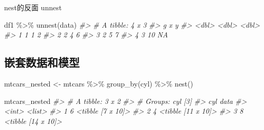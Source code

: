 \documentclass[
]{book}
\newenvironment{Shaded}{\begin{snugshade}}{\end{snugshade}}
\newcommand{\CommentTok}[1]{\textcolor[rgb]{0.56,0.35,0.01}{\textit{#1}}}
\newcommand{\FunctionTok}[1]{\textcolor[rgb]{0.00,0.00,0.00}{#1}}
\newcommand{\NormalTok}[1]{#1}
\newcommand{\OtherTok}[1]{\textcolor[rgb]{0.56,0.35,0.01}{#1}}
\newcommand{\SpecialCharTok}[1]{\textcolor[rgb]{0.00,0.00,0.00}{#1}}
\begin{document}
nest的反面 unnest

\begin{Shaded}
\begin{Highlighting}[]
\NormalTok{df1 }\SpecialCharTok{\%\textgreater{}\%} \FunctionTok{unnest}\NormalTok{(data)}
\CommentTok{\#\textgreater{} \# A tibble: 4 x 3}
\CommentTok{\#\textgreater{}       g     x     y}
\CommentTok{\#\textgreater{}   \textless{}dbl\textgreater{} \textless{}dbl\textgreater{} \textless{}dbl\textgreater{}}
\CommentTok{\#\textgreater{} 1     1     1     2}
\CommentTok{\#\textgreater{} 2     2     4     6}
\CommentTok{\#\textgreater{} 3     2     5     7}
\CommentTok{\#\textgreater{} 4     3    10    NA}
\end{Highlighting}
\end{Shaded}

\hypertarget{ux5d4cux5957ux6570ux636eux548cux6a21ux578b}{%
\subsection{嵌套数据和模型}\label{ux5d4cux5957ux6570ux636eux548cux6a21ux578b}}

\begin{Shaded}
\begin{Highlighting}[]
\NormalTok{mtcars\_nested }\OtherTok{\textless{}{-}}\NormalTok{ mtcars }\SpecialCharTok{\%\textgreater{}\%} 
  \FunctionTok{group\_by}\NormalTok{(cyl) }\SpecialCharTok{\%\textgreater{}\%} 
  \FunctionTok{nest}\NormalTok{()}

\NormalTok{mtcars\_nested}
\CommentTok{\#\textgreater{} \# A tibble: 3 x 2}
\CommentTok{\#\textgreater{} \# Groups:   cyl [3]}
\CommentTok{\#\textgreater{}     cyl data              }
\CommentTok{\#\textgreater{}   \textless{}int\textgreater{} \textless{}list\textgreater{}            }
\CommentTok{\#\textgreater{} 1     6 \textless{}tibble [7 x 10]\textgreater{} }
\CommentTok{\#\textgreater{} 2     4 \textless{}tibble [11 x 10]\textgreater{}}
\CommentTok{\#\textgreater{} 3     8 \textless{}tibble [14 x 10]\textgreater{}}
\end{Highlighting}
\end{Shaded}
\end{document}

